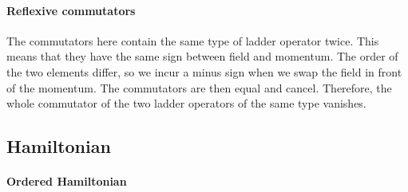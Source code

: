 \documentclass[11pt, english, fleqn, DIV=15, headinclude, BCOR=1cm]{scrartcl}
\begin{document}
\paragraph{Reflexive commutators}

The commutators here contain the same type of ladder operator twice. This means
that they have the same sign between field and momentum. The order of the two
elements differ, so we incur a minus sign when we swap the field in front of
the momentum. The commutators are then equal and cancel. Therefore, the whole
commutator of the two ladder operators of the same type vanishes.

\subsection{Hamiltonian}

\paragraph{Ordered Hamiltonian}
\end{document}
